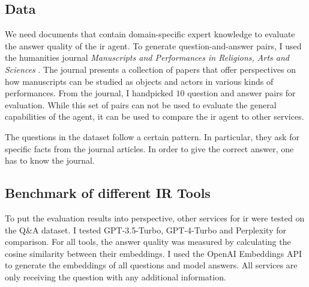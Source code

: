 \documentclass[../main.tex]{subfiles}
\begin{document}
\subsection{Data}

We need documents that contain domain-specific expert knowledge
to evaluate the answer quality of the \gls{ir} agent.
To generate question-and-answer pairs,
I used the humanities journal
\emph{Manuscripts and Performances in Religions, Arts and Sciences} \cite{Brita2023}.
The journal presents a collection of papers that offer perspectives on how
manuscripts can be studied as objects and actors in various kinds of performances.
From the journal, I handpicked $10$ question and answer pairs for evaluation.
While this set of pairs can not be used to evaluate the general capabilities of the agent,
it can be used to compare the \gls{ir} agent to other services.

The questions in the dataset follow a certain pattern.
In particular, they ask for specific facts from the journal articles.
In order to give the correct answer, one has to know the journal.

\subsection{Benchmark of different IR Tools}

To put the evaluation results into perspective,
other services for \gls{ir} were tested on the Q\&A dataset.
I tested GPT-3.5-Turbo, GPT-4-Turbo and Perplexity for comparison.
For all tools, the answer quality was measured
by calculating the cosine similarity between their embeddings.
I used the OpenAI Embeddings API \cite{zotero-253} to generate the embeddings of all questions and model answers.
All services are only receiving the question with any additional information.
\end{document}
